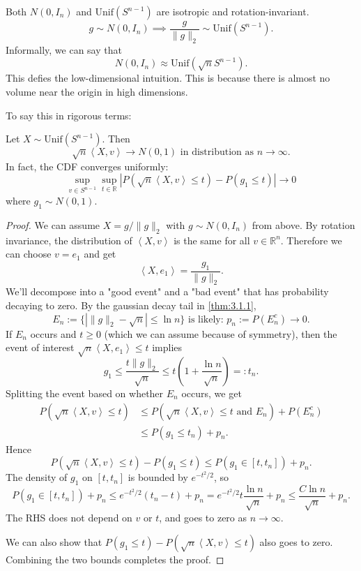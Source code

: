 \begin{note}
Both $N(0, I_n)$ and $\mathrm{Unif}(S^{n - 1})$ are isotropic and rotation-invariant. 
\[ g \sim N(0, I_n) \implies \frac{g}{\lVert g \rVert_{2}} \sim \mathrm{Unif}(S^{n - 1}). \]
Informally, we can say that 
\[ N(0, I_n) \approx \mathrm{Unif}(\sqrt{n}S^{n - 1}). \]
This defies the low-dimensional intuition. This is because there is almost no volume near the origin 
in high dimensions. 
\end{note}

To say this in rigorous terms: 
\begin{theorem}
\label{thm:3.3.10}
Let $X \sim \mathrm{Unif}(S^{n - 1})$. Then 
\[ \sqrt{n}\left\langle X, v \right\rangle \to N(0, 1) \text{ in distribution as } n \to \infty. \]
In fact, the CDF converges uniformly: 
\[ \sup_{v \in S^{n - 1}} \sup_{t \in \mathbb{R}} |P(\sqrt{n}\left\langle X, v \right\rangle \leq t) 
- P(g_1 \leq t)| \to 0 \]
where $g_1 \sim N(0, 1)$.
\end{theorem}

\begin{proof}
We can assume $X = g / \lVert g \rVert_{2}$ with $g \sim N(0, I_n)$ from above. By rotation invariance, 
the distribution of $\left\langle X, v \right\rangle$ is the same for all $v \in \mathbb{R}^n$. Therefore 
we can choose $v = e_1$ and get 
\[ \left\langle X, e_1 \right\rangle = \frac{g_1}{\lVert g \rVert_{2}}. \]
We'll decompose into a "good event" and a "bad event" that has probability decaying to zero. By the gaussian 
decay tail in \cref{thm:3.1.1},
\[ E_n := \{ |\lVert g \rVert_{2} - \sqrt{n}| \leq \ln{n} \} \text{ is likely: } 
p_n := P(E_n^c) \to 0. \]
If $E_n$ occurs and $t \geq 0$ (which we can assume because of symmetry), then the event of interest 
$\sqrt{n} \left\langle X, e_1 \right\rangle \leq t$ implies 
\[ g_1 \leq \frac{t \lVert g \rVert_{2}}{\sqrt{n}} \leq t \left( 1 + \frac{\ln{n}}{\sqrt{n}} \right) =: t_n. \]
Splitting the event based on whether $E_n$ occurs, we get 
\begin{align*}
	P(\sqrt{n}\left\langle X, v \right\rangle \leq t) 
	&\leq P (\sqrt{n}\left\langle X, v \right\rangle \leq t \text{ and } E_n) + P(E_n^c) \\
	&\leq P(g_1 \leq t_n) + p_n.
\end{align*}
Hence 
\[ P(\sqrt{n}\left\langle X, v \right\rangle \leq t) - P(g_1 \leq t) 
\leq P(g_1 \in [t, t_n]) + p_n. \]
The density of $g_1$ on $[t, t_n]$ is bounded by $e^{-t^2 / 2}$, so 
\[ P(g_1 \in [t, t_n]) + p_n \leq e^{-t^2 / 2}(t_n - t) + p_n 
= e^{-t^2 / 2}t \frac{\ln{n}}{\sqrt{n}} + p_n \leq \frac{C \ln{n}}{\sqrt{n}} + p_n. \]
The RHS does not depend on $v$ or $t$, and goes to zero as $n \to \infty$.

We can also show that $P(g_1 \leq t) - P(\sqrt{n}\left\langle X, v \right\rangle \leq t)$ also goes to 
zero. Combining the two bounds completes the proof.
\end{proof}

